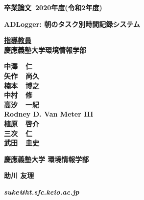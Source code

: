 \pagestyle{empty}

\begin{center}

\vspace{5cm}

\textbf{\Large 卒業論文~2020年度(令和2年度)}

\vspace{2cm}

\textbf{\LARGE ADLogger: 朝のタスク別時間記録システム}

\vspace{3cm}

\textbf{\underline{\large 指導教員}}\\
\textbf{慶應義塾大学環境情報学部}

\textbf{\Large 中澤~~仁}\\
\textbf{\Large 矢作~~尚久}\\
\textbf{\Large 楠本~~博之}\\
\textbf{\Large 中村~~修}\\
\textbf{\Large 高汐~~一紀}\\
\textbf{\Large Rodney D. Van Meter III}\\
\textbf{\Large 植原~~啓介}\\
\textbf{\Large 三次~~仁}\\
\textbf{\Large 武田~~圭史}\\

\vspace{6cm}

\textbf{\LARGE 慶應義塾大学 環境情報学部}

\vspace{.5em}

\textbf{\LARGE 助川 友理}

\vspace{.3em}

\textbf{\it suke@ht.sfc.keio.ac.jp}



\newpage

\end{center}

\pagestyle{plain}
